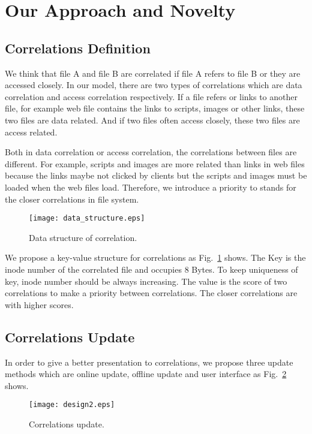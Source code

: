 \section{Our Approach and Novelty}
\subsection{Correlations Definition}

We think that file A and file B are correlated if file A refers to file B or they are accessed closely. In our model, there are two types of correlations which are data correlation and access correlation respectively. If a file refers or links to another file, for example web file contains the links to scripts, images or other links, these two files are data related. And if two files often access closely, these two files are access related.

Both in data correlation or access correlation, the correlations between files are different. For example, scripts and images are more related than links in web files because the links maybe not clicked by clients but the scripts and images must be loaded when the web files load. Therefore, we introduce a priority to stands for the closer correlations in file system.
\begin{figure}[htbp]
  \centering
  \texttt{[image: data\_structure.eps]}\\
  \caption{Data structure of correlation.}\label{fig:data-structure}
\end{figure}

We propose a key-value structure for correlations as Fig.~\ref{fig:data-structure} shows. The Key is the inode number of the correlated file and occupies 8 Bytes. To keep uniqueness of key, inode number should be always increasing. The value is the score of two correlations to make a priority between correlations. The closer correlations are with higher scores.

\subsection{Correlations Update}

In order to give a better presentation to correlations, we propose three update methods which are online update, offline update and user interface as Fig.~\ref{fig:design} shows.
\begin{figure}[htbp]
  \centering
  \texttt{[image: design2.eps]}\\
  \caption{Correlations update.}\label{fig:design}
\end{figure}

